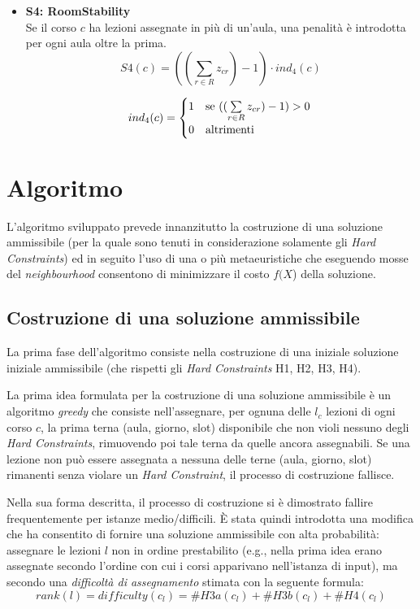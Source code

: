 \documentclass[]{article}
\newcommand{\E}{È }
\begin{document}
\begin{itemize}
	\item \textbf{S4: RoomStability} \mbox{}\\	

Se il corso $c$ ha lezioni assegnate in più di un'aula, una penalità è introdotta per ogni aula oltre la prima.
	\[ S4(c) = ((\sum_{r \in R} z_{cr}) - 1)  \cdot ind_4(c)\]

	\[ 
	ind_4(c) = 
	\begin{cases}
		1 & \text{se $ ((\sum\limits_{r \in R} z_{cr}) - 1) > 0 $} \\
		0 & \text{altrimenti}
	\end{cases}\\
	\]

\end{itemize}

\section{Algoritmo}
L'algoritmo sviluppato prevede innanzitutto la costruzione di una soluzione ammissibile (per la quale sono tenuti in considerazione solamente gli \textit{Hard Constraints}) ed in seguito l'uso di una o più metaeuristiche che eseguendo mosse del \textit{neighbourhood} consentono di minimizzare il costo $f(X$) della soluzione.

\subsection{Costruzione di una soluzione ammissibile}
La prima fase dell'algoritmo consiste nella costruzione di una iniziale soluzione iniziale ammissibile (che rispetti gli \textit{Hard Constraints} H1, H2, H3, H4).

La prima idea formulata per la costruzione di una soluzione ammissibile è un algoritmo \textit{greedy} che consiste nell'assegnare, per ognuna delle $l_c$ lezioni di ogni corso $c$, la prima terna (aula, giorno, slot) disponibile che non violi nessuno degli \textit{Hard Constraints}, rimuovendo poi tale terna da quelle ancora assegnabili.
Se una lezione non può essere assegnata a nessuna delle terne (aula, giorno, slot) rimanenti senza violare un \textit{Hard Constraint}, il processo di costruzione fallisce.

Nella sua forma descritta, il processo di costruzione si è dimostrato fallire frequentemente per istanze medio/difficili.
\E stata quindi introdotta una modifica che ha consentito di fornire una soluzione ammissibile con alta probabilità: assegnare le lezioni $l$ non in ordine prestabilito (e.g., nella prima idea erano assegnate secondo l'ordine con cui i corsi apparivano nell'istanza di input), ma secondo una \textit{difficoltà di assegnamento} stimata con la seguente formula:
\[ \mathit{rank(l)} = \mathit{difficulty(c_l)} = \#{H3a}(c_l) + 	\#{H3b}(c_l) + \#{H4}(c_l) \]
\end{document}
